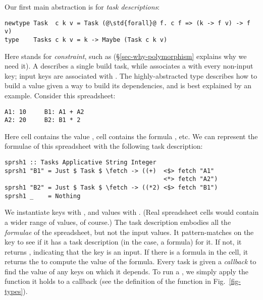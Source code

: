 Our first main abstraction is for \emph{task descriptions}:
\begin{verbatim}
newtype Task  c k v = Task (@\std{forall}@ f. c f => (k -> f v) -> f v)
type    Tasks c k v = k -> Maybe (Task c k v)
\end{verbatim}

\noindent
Here  stands for \emph{constraint}, such as 
(\S\ref{sec-why-polymorphism} explains why we need it).
A  describes a single build task, while  associates a
 with every non-input key; input keys are associated with .
The highly-abstracted type  describes how to build a value given
a way to build its dependencies, and is best explained by an example.
Consider this \Excel spreadsheet:

\vspace{1mm}
\begin{verbatim}
A1: 10     B1: A1 + A2
A2: 20     B2: B1 * 2
\end{verbatim}
\vspace{1mm}

\noindent
Here cell  contains the value , cell  contains the
formula , etc. We can represent the formulae of this spreadsheet
with the following task description:

\vspace{1mm}
\begin{verbatim}
sprsh1 :: Tasks Applicative String Integer
sprsh1 "B1" = Just $ Task $ \fetch -> ((+)  <$> fetch "A1"
                                            <*> fetch "A2")
sprsh1 "B2" = Just $ Task $ \fetch -> ((*2) <$> fetch "B1")
sprsh1 _    = Nothing
\end{verbatim}
\vspace{1mm}

\noindent
We instantiate keys  with , and values  with .
(Real spreadsheet cells would contain a wider range of values, of course.) The
task description  embodies all the \emph{formulae} of the spreadsheet,
but not the input values. It pattern-matches on the key to see if it has a task
description (in the \Excel case, a formula) for it. If not, it returns
, indicating that the key is an input. If there is a formula in the
cell, it returns the  to compute the value of the formula. Every
task is given a \emph{callback}  to find the value of any keys on
which it depends. To run a , we simply apply the function it holds to a
callback (see the definition of the function  in Fig.~\ref{fig-types}).

